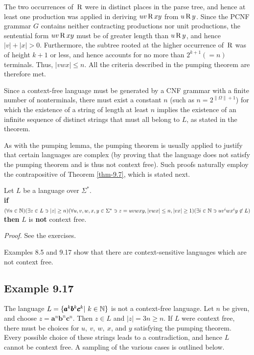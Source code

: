 \begin{thm}
The two occurrences of \,$\operatorname{R}$ were in distinct places in the parse tree, and hence at
least one production was applied in deriving $uv\operatorname{R} xy$ from $u\operatorname{R} y$. Since the
PCNF grammar $G$ contains neither contracting productions nor unit productions,
the sentential form $uv\operatorname{R} xy$ must be of greater length than $u\operatorname{R} y$, and hence
$|v|+|x|>0$. Furthermore, the subtree rooted at the higher occurrence of \,$\operatorname{R}$ was
of height $k+1$ or less, and hence accounts for no more than $2^{k+1}(=n)$
terminals. Thus, $|vwx| \leq n$.
All the criteria described in the pumping theorem are therefore met.

Since a
context-free language must be generated by a CNF grammar with a finite number of
nonterminals, there must exist a constant $n$ (such as $n = 2^{\|\Omega\|+1}$)
for which the existence of a string of length at least $n$ implies the existence
of an infinite sequence of distinct strings that must all belong to $L$, as
stated in the theorem.
\end{thm}

As with the pumping lemma, the pumping theorem is usually applied to justify
that certain languages are complex (by proving that the language does not
satisfy the pumping theorem and is thus not context free). Such proofs naturally
employ the contrapositive of Theorem \ref{thm-9.7}, which is stated next.

\begin{thm}\label{thm-9.8}
Let $L$ be a language over $\Sigma^*$. \\
\textbf{if} $(\forall n\in\mathbb{N})(\exists z\in L \ni |z| \geq n)(\forall u,v,w,x,y \in
\Sigma^* \ni z = uvwxy, |vwx| \leq n, |vx|\geq 1)(\exists i\in\mathbb{N} \ni uv^iwx^iy
\not \in L)$ \\
\textbf{then} $L$ is \textbf{not} context free.

\emph{Proof.} See the exercises.
\end{thm}

Examples 8.5 and 9.17 show that there are context-sensitive languages which are
not context free.

\subsection*{Example 9.17}

The language $L=\{\pmb{a}^k\pmb{b}^k\pmb{c}^k|\ k\in\mathbb{N}\}$ is not a context-free language. Let $n$
be given, and choose $z=\pmb{a}^n\pmb{b}^n\pmb{c}^n$. Then $z\in L$ and $|z|= 3n \geq n$. If $L$
were context free, there must be choices for $u,\ v,\ w,\ x$, and $y$ satisfying
the pumping theorem. Every possible choice of these strings leads to a
contradiction, and hence $L$ cannot be context free. A sampling of the various
cases is outlined below.

